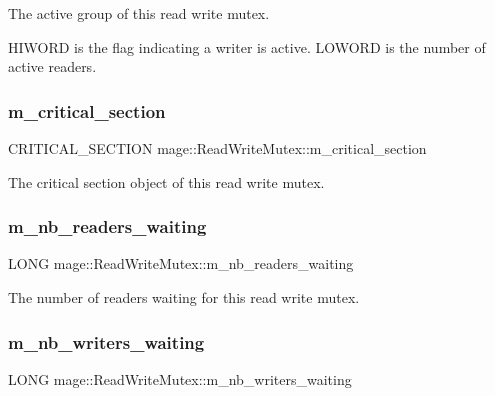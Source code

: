 The active group of this read write mutex.

{\ttfamily H\+I\+W\+O\+RD} is the flag indicating a writer is active. {\ttfamily L\+O\+W\+O\+RD} is the number of active readers. \hypertarget{structmage_1_1_read_write_mutex_a77fe51b87e5205d60ea045fa53bc1fa3}{}\label{structmage_1_1_read_write_mutex_a77fe51b87e5205d60ea045fa53bc1fa3} 
\subsubsection{\texorpdfstring{m\+\_\+critical\+\_\+section}{m\_critical\_section}}
{\footnotesize\ttfamily C\+R\+I\+T\+I\+C\+A\+L\+\_\+\+S\+E\+C\+T\+I\+ON mage\+::\+Read\+Write\+Mutex\+::m\+\_\+critical\+\_\+section\hspace{0.3cm}{\ttfamily [private]}}

The critical section object of this read write mutex. \hypertarget{structmage_1_1_read_write_mutex_acbe7553fff7cca2656f6f2b8f0471484}{}\label{structmage_1_1_read_write_mutex_acbe7553fff7cca2656f6f2b8f0471484} 
\subsubsection{\texorpdfstring{m\+\_\+nb\+\_\+readers\+\_\+waiting}{m\_nb\_readers\_waiting}}
{\footnotesize\ttfamily L\+O\+NG mage\+::\+Read\+Write\+Mutex\+::m\+\_\+nb\+\_\+readers\+\_\+waiting\hspace{0.3cm}{\ttfamily [private]}}

The number of readers waiting for this read write mutex. \hypertarget{structmage_1_1_read_write_mutex_a003313794a9b43f80bd9b258b039438d}{}\label{structmage_1_1_read_write_mutex_a003313794a9b43f80bd9b258b039438d} 
\subsubsection{\texorpdfstring{m\+\_\+nb\+\_\+writers\+\_\+waiting}{m\_nb\_writers\_waiting}}
{\footnotesize\ttfamily L\+O\+NG mage\+::\+Read\+Write\+Mutex\+::m\+\_\+nb\+\_\+writers\+\_\+waiting\hspace{0.3cm}{\ttfamily [private]}}

